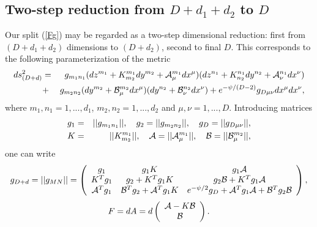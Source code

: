 \documentclass[a4paper,12pt]{article}
\begin{document}
\begin{appendix}
\section{Two-step reduction from $D+d_1+d_2$ to $D$}
Our split (\ref{Fg}) may be regarded as a two-step dimensional
reduction: first from $(D+d_1+d_2)$ dimensions to $(D+d_2)$,
second to final $D$. This corresponds to the following
parameterization of the metric
\begin{eqnarray}
ds_{(D+d)}^2 &=& g_{m_1n_1} (dz^{m_1}+K^{m_1}_{m_2}dy^{m_2}+{\cal
A}^{m_1}_{\mu}dx^{\mu}) (dz^{n_1}+K^{n_1}_{n_2}dy^{n_2}+{\cal
A}^{n_1}_{\nu}dx^{\nu}) \nonumber \\
&+& g_{m_2n_2}(dy^{m_2}+{\cal B}^{m_2}_{\mu}dx^{\mu})
(dy^{n_2}+{\cal B}^{n_2}_{\nu}dx^{\nu}) +
e^{-\psi/(D-2)}g_{D\mu\nu}dx^{\mu}dx^{\nu},
\end{eqnarray}
where $m_1, n_1 = 1,...,d_1$, $m_2, n_2 = 1,...,d_2$ and $\mu,
\nu = 1,...,D$. Introducing matrices
\begin{eqnarray}
g_1 &=& ||g_{m_1n_1}||, \quad g_2 = ||g_{m_2n_2}||, \quad
g_D = ||g_{D\mu\nu}||, \\
K &=& ||K^{m_1}_{m_2}||, \quad {\cal A} = ||{\cal
A}^{m_1}_{\mu}||, \quad {\cal B} = ||{\cal B}^{m_2}_{\mu}||,
\end{eqnarray}
one can write
\begin{equation}
g_{D+d} = ||g_{MN}|| = \left( \begin{array}{ccc}
  g_1          & g_1 K           & g_1{\cal A} \\
  K^T g_1      & g_2 + K^T g_1 K & g_2{\cal B}+K^T g_1{\cal A}\\
  {\cal A}^T g_1 & {\cal B}^T g_2 + {\cal A}^T g_1 K
    & e^{-\psi/2} g_D + {\cal A}^T g_1{\cal A}
      + {\cal B}^T g_2{\cal B}
  \end{array} \right),
\end{equation}
\begin{equation}
F = dA = d \left( \begin{array}{c}
  {\cal A} - K{\cal B} \\
  {\cal B}
  \end{array} \right).
\end{equation}


\end{appendix}
\end{document}
